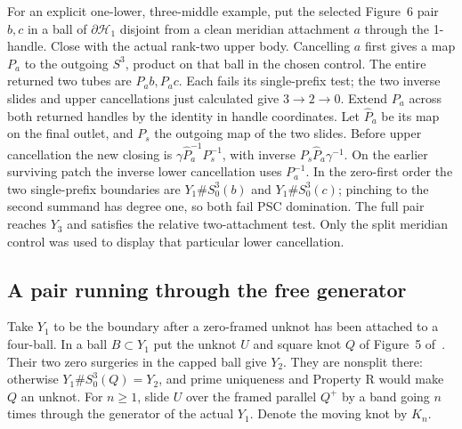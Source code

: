 \documentclass[11pt,letterpaper]{article}
\numberwithin{equation}{section}
\theoremstyle{remark}
\newcommand{\HB}[1]{\mathcal H_{#1}}
\begin{document}
For an explicit one-lower, three-middle example, put the selected
Figure~6 pair \(b,c\) in a ball of \(\partial\HB1\) disjoint from
a clean meridian attachment \(a\) through the 1-handle. Close with
the actual rank-two upper body. Cancelling \(a\) first gives a
map \(P_a\) to the outgoing \(S^3\), product on that ball in the
chosen control. The entire returned two tubes are \(P_ab,P_ac\).
Each fails its single-prefix test; the two inverse slides and
upper cancellations just calculated give \(3\to2\to0\).
Extend \(P_a\) across both returned handles by the identity in
handle coordinates. Let \(\widehat P_a\) be its map on the final
outlet, and \(P_s\) the outgoing map of the two slides.
Before upper cancellation the new closing is
\(\gamma\widehat P_a^{-1}P_s^{-1}\), with inverse
\(P_s\widehat P_a\gamma^{-1}\). On the earlier surviving patch
the inverse lower cancellation uses \(P_a^{-1}\). In the zero-first order the
two single-prefix boundaries are \(Y_1\# S^3_0(b)\) and
\(Y_1\# S^3_0(c)\); pinching to the second summand has degree
one, so both fail PSC domination. The full pair reaches \(Y_3\)
and satisfies the relative two-attachment test. Only the split
meridian control was used to display that particular lower cancellation.

\subsection{A pair running through the free generator}\label{sec:generator}

Take \(Y_1\) to be the boundary after a zero-framed unknot has been
attached to a four-ball. In a ball \(B\subset Y_1\) put the unknot
\(U\) and square knot \(Q\) of Figure~5
of~\cite{GompfScharlemannThompson2010}. Their two zero surgeries in
the capped ball give \(Y_2\). They are nonsplit there: otherwise
\(Y_1\#S^3_0(Q)=Y_2\), and prime uniqueness and Property R would
make \(Q\) an unknot. For \(n\ge1\), slide \(U\) over the framed
parallel \(Q^+\) by a band going \(n\) times through the generator
of the actual \(Y_1\). Denote the moving knot by \(K_n\).
\end{document}
